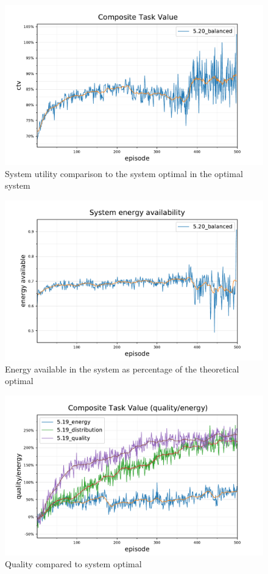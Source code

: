 
\begin{figure}[ht]
	\centering
	\includegraphics[width=0.7\linewidth]{5_ctv-optimal-ctv}
	\captionsetup{labelfont=bf,singlelinecheck=on}
	\caption{System utility comparison to the system optimal in the optimal system}
	\label{fig:5_ctv-optimal-ctv}
\end{figure}
\begin{figure}[ht]
	\centering
	\includegraphics[width=0.7\linewidth]{5_ctv-statistics-energy-available}
	\captionsetup{labelfont=bf,singlelinecheck=on}
	\caption{Energy available in the system as percentage of the theoretical optimal}
	\label{fig:5_ctv-statistics-energy-available}
\end{figure}
\begin{figure}[ht]
	\centering
	\includegraphics[width=0.8\linewidth]{5.19_ctv-quality-energy}
	\captionsetup{labelfont=bf,singlelinecheck=on}
	\caption{Quality compared to system optimal}
	\label{fig:5.19_ctv-quality-energy}
\end{figure}

